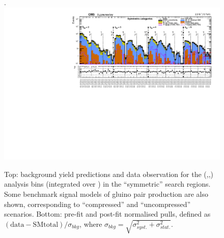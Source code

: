 \clearpage
\begin{landscape}
  \begin{center}
    \begin{figure}[h!]
      \caption{Top: background yield predictions and data observation for the (\njet,\nb,\scalht) analysis bins (integrated over \mht) in the ``symmetric'' search regions. Some benchmark signal models of gluino pair production are also shown, corresponding to ``compressed'' and ``uncompressed'' scenarios. Bottom: pre-fit and post-fit normalised pulls, defined as $(\mathrm{data}-\mathrm{SM total})/\sigma_{bkg}$, where $\sigma_{bkg}=\sqrt{\sigma^{2}_{syst.}+\sigma^{2}_{stat.}}$. \label{fig:summaryPlot_Symmetric}}.
      \includegraphics[width=0.8\linewidth]{supplementary/figures/summaryPlot_Symmetric_prefit_overlay_fit_b}
    \end{figure}
  \end{center}
\end{landscape}


